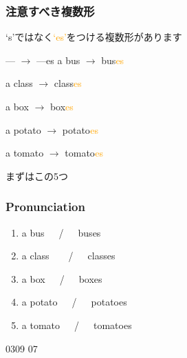 \documentclass[aspectratio=169,xcolor={dvipsnames,table}]{beamer}
\newcommand{\myaudio}[1]{\href{#1}{\faVolumeUp}}
\begin{document}
\begin{frame}[plain]\frametitle{注意すべき複数形}

  {\Large `s'ではなく\textcolor{orange}{`es'}をつける複数形があります}
  \pause

  \bigskip

  \begin{block}{--- $\rightarrow$ ---es}
    a bus \pause$\longrightarrow$ bus\textcolor{orange}{es}\pause%
    \hfill{}\hspace*{250pt}\pause

    a class \pause$\longrightarrow$ class\textcolor{orange}{es}\pause
    \hfill{}\hspace*{250pt}\pause

    a box \pause $\longrightarrow$ box\textcolor{orange}{es}\pause
    \hfill{}\hspace*{250pt}\pause

    a potato \pause$\longrightarrow$ potato\textcolor{orange}{es}\pause
    \hfill{}\hspace*{250pt}\pause

    a tomato \pause$\longrightarrow$ tomato\textcolor{orange}{es}\pause
    \hfill{}\hspace*{250pt}
  \end{block}
  \pause

  \hfill{\scriptsize まずはこの5つ}
\end{frame}
\begin{frame}[plain]\frametitle{Pronunciation}

  \begin{enumerate}
    \item a bus~~~\pause{}/~~~buses\pause%
          \hfill{}\hspace{180pt}\mbox{} \item a class~~~~\pause{}/~~~classes\pause%
          \hfill{}\hspace{180pt}\mbox{}
    \item a box~~~\pause{}/~~~boxes\pause%
          \hfill{}\hspace{180pt}\mbox{}
    \item a potato~~~\pause{}/~~~potatoes\pause%
          \hfill{}\hspace{180pt}\mbox{} \item a tomato~~~\pause{}/~~~tomatoes%
          \hfill{}\hspace{180pt}\mbox{}
  \end{enumerate}

  \bigskip

  \bigskip

  \mbox{}\hfill{\tiny 0309}\,{\scriptsize \myaudio{./audio/005_singular_plural_07.mp3}}\,{\tiny 07}
\end{frame}
\end{document}

